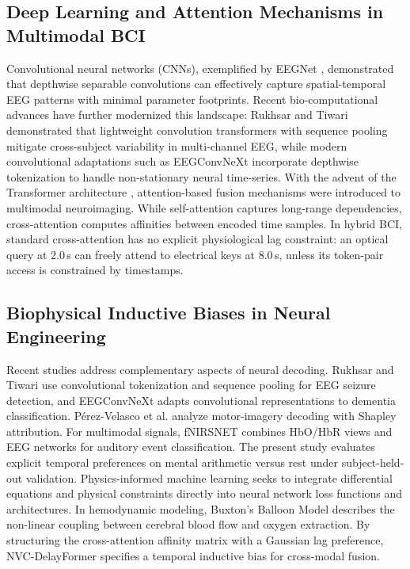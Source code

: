 \documentclass[final,5p,times,twocolumn]{elsarticle}
\begin{document}
\subsection{Deep Learning and Attention Mechanisms in Multimodal BCI}
Convolutional neural networks (CNNs), exemplified by EEGNet \cite{lawhern2018eegnet}, demonstrated that depthwise separable convolutions can effectively capture spatial-temporal EEG patterns with minimal parameter footprints. Recent bio-computational advances have further modernized this landscape: Rukhsar and Tiwari \cite{salim2023lightweight} demonstrated that lightweight convolution transformers with sequence pooling mitigate cross-subject variability in multi-channel EEG, while modern convolutional adaptations such as EEGConvNeXt \cite{acharya2025eegconvnext} incorporate depthwise tokenization to handle non-stationary neural time-series. With the advent of the Transformer architecture \cite{vaswani2017attention}, attention-based fusion mechanisms were introduced to multimodal neuroimaging. While self-attention captures long-range dependencies, cross-attention computes affinities between encoded time samples. In hybrid BCI, standard cross-attention has no explicit physiological lag constraint: an optical query at 2.0\,s can freely attend to electrical keys at 8.0\,s, unless its token-pair access is constrained by timestamps.

\subsection{Biophysical Inductive Biases in Neural Engineering}
Recent studies address complementary aspects of neural decoding. Rukhsar and Tiwari \cite{salim2023lightweight} use convolutional tokenization and sequence pooling for EEG seizure detection, and EEGConvNeXt \cite{acharya2025eegconvnext} adapts convolutional representations to dementia classification. P{\'e}rez-Velasco et al. \cite{perez2024unraveling} analyze motor-imagery decoding with Shapley attribution. For multimodal signals, fNIRSNET \cite{pandey2024fnirsnet} combines HbO/HbR views and EEG networks for auditory event classification. The present study evaluates explicit temporal preferences on mental arithmetic versus rest under subject-held-out validation.
Physics-informed machine learning seeks to integrate differential equations and physical constraints directly into neural network loss functions and architectures. In hemodynamic modeling, Buxton's Balloon Model \cite{buxton1998dynamics} describes the non-linear coupling between cerebral blood flow and oxygen extraction. By structuring the cross-attention affinity matrix with a Gaussian lag preference, NVC-DelayFormer specifies a temporal inductive bias for cross-modal fusion.
\end{document}
